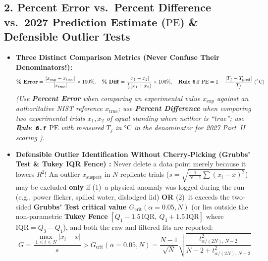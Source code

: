 \subsection{2. Percent Error vs.\ Percent Difference vs.\ 2027 Prediction Estimate ($\mathrm{PE}$) \& Defensible Outlier Tests}
\begin{itemize}
  \item \textbf{Three Distinct Comparison Metrics (Never Confuse Their Denominators!):}
  \begin{equation}\label{eq:18:metrics}
    \text{\textbf{\% Error}} = \frac{|x_{\mathrm{exp}} - x_{\mathrm{true}}|}{|x_{\mathrm{true}}|}\times 100\%, \quad
    \text{\textbf{\% Diff}} = \frac{|x_1 - x_2|}{\tfrac{1}{2}(x_1 + x_2)}\times 100\%, \quad
    \text{\textbf{Rule 6.f }}\mathrm{PE} = 1 - \frac{|T_f - T_{\mathrm{pred}}|}{T_f}\ (^\circ\mathrm{C})
  \end{equation}
  \emph{(Use \textbf{Percent Error} when comparing an experimental value $x_{\mathrm{exp}}$ against an authoritative NIST reference $x_{\mathrm{true}}$; use \textbf{Percent Difference} when comparing two experimental trials $x_1, x_2$ of equal standing where neither is ``true''; use \textbf{Rule~\texttt{6.f} $\mathrm{PE}$} with measured $T_f$ in $\si{\celsius}$ in the denominator for 2027 Part~II scoring ).}
  \item \textbf{Defensible Outlier Identification Without Cherry-Picking (Grubbs' Test \& Tukey IQR Fence) :}
  Never delete a data point merely because it lowers $R^2$! An outlier $x_{\mathrm{suspect}}$ in $N$ replicate trials ($s = \sqrt{\frac{1}{N-1}\sum (x_i - \bar{x})^2}$) may be excluded \textbf{only} if (1)~a physical anomaly was logged during the run (e.g., power flicker, spilled water, dislodged lid) \textbf{OR} (2)~it exceeds the two-sided \textbf{Grubbs' Test critical value $G_{\mathrm{crit}}(\alpha=0.05, N)$} (or lies outside the non-parametric \textbf{Tukey Fence} $[Q_1 - 1.5\,\mathrm{IQR},\ Q_3 + 1.5\,\mathrm{IQR}]$ where $\mathrm{IQR} = Q_3 - Q_1$), and both the raw and filtered fits are reported:
  \begin{equation}\label{eq:18:grubbs}
    G = \frac{\max_{1\le i\le N}|x_i - \bar{x}|}{s} > G_{\mathrm{crit}}(\alpha=0.05, N) = \frac{N - 1}{\sqrt{N}}\sqrt{\frac{t_{\alpha/(2N),\,N-2}^2}{N - 2 + t_{\alpha/(2N),\,N-2}^2}}
  \end{equation}
  \begin{center}
  \footnotesize

\end{center}
\end{itemize}
